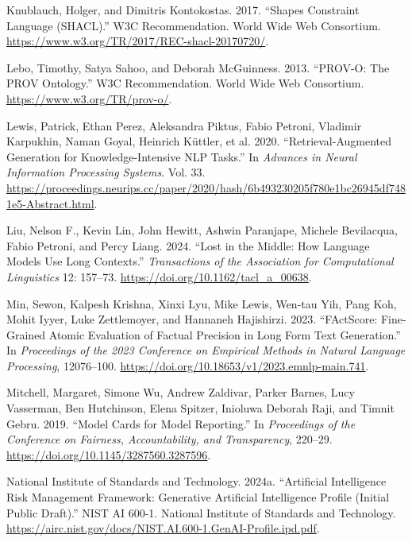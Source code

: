 \documentclass[
  11pt,
]{article}
\newlength{\cslhangindent}
\newenvironment{CSLReferences}[2] %
 {\begin{list}{}{%
  \setlength{\itemindent}{0pt}
  \setlength{\leftmargin}{0pt}
  \setlength{\parsep}{0pt}
  \ifodd #1
   \setlength{\leftmargin}{\cslhangindent}
   \setlength{\itemindent}{-1\cslhangindent}
  \fi
  \setlength{\itemsep}{#2\baselineskip}}}
 {\end{list}}
\begin{document}
\begin{CSLReferences}{1}{0}
Knublauch, Holger, and Dimitris Kontokostas. 2017. {``Shapes Constraint
Language (SHACL).''} W3C Recommendation. World Wide Web Consortium.
\url{https://www.w3.org/TR/2017/REC-shacl-20170720/}.

Lebo, Timothy, Satya Sahoo, and Deborah McGuinness. 2013. {``PROV-O: The
PROV Ontology.''} W3C Recommendation. World Wide Web Consortium.
\url{https://www.w3.org/TR/prov-o/}.

Lewis, Patrick, Ethan Perez, Aleksandra Piktus, Fabio Petroni, Vladimir
Karpukhin, Naman Goyal, Heinrich Küttler, et al. 2020.
{``Retrieval-Augmented Generation for Knowledge-Intensive NLP Tasks.''}
In \emph{Advances in Neural Information Processing Systems}. Vol. 33.
\url{https://proceedings.neurips.cc/paper/2020/hash/6b493230205f780e1bc26945df7481e5-Abstract.html}.

Liu, Nelson F., Kevin Lin, John Hewitt, Ashwin Paranjape, Michele
Bevilacqua, Fabio Petroni, and Percy Liang. 2024. {``Lost in the Middle:
How Language Models Use Long Contexts.''} \emph{Transactions of the
Association for Computational Linguistics} 12: 157--73.
\url{https://doi.org/10.1162/tacl_a_00638}.

Min, Sewon, Kalpesh Krishna, Xinxi Lyu, Mike Lewis, Wen-tau Yih, Pang
Koh, Mohit Iyyer, Luke Zettlemoyer, and Hannaneh Hajishirzi. 2023.
{``FActScore: Fine-Grained Atomic Evaluation of Factual Precision in
Long Form Text Generation.''} In \emph{Proceedings of the 2023
Conference on Empirical Methods in Natural Language Processing},
12076--100. \url{https://doi.org/10.18653/v1/2023.emnlp-main.741}.

Mitchell, Margaret, Simone Wu, Andrew Zaldivar, Parker Barnes, Lucy
Vasserman, Ben Hutchinson, Elena Spitzer, Inioluwa Deborah Raji, and
Timnit Gebru. 2019. {``Model Cards for Model Reporting.''} In
\emph{Proceedings of the Conference on Fairness, Accountability, and
Transparency}, 220--29. \url{https://doi.org/10.1145/3287560.3287596}.

National Institute of Standards and Technology. 2024a. {``Artificial
Intelligence Risk Management Framework: Generative Artificial
Intelligence Profile (Initial Public Draft).''} NIST AI 600-1. National
Institute of Standards and Technology.
\url{https://airc.nist.gov/docs/NIST.AI.600-1.GenAI-Profile.ipd.pdf}.


\end{CSLReferences}
\end{document}
